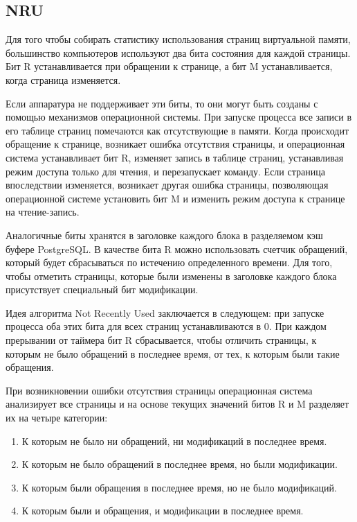 \subsection{NRU}

Для того чтобы собирать статистику использования страниц виртуальной памяти, большинство компьютеров используют два бита состояния для каждой страницы.
Бит R устанавливается при обращении к странице, а бит M устанавливается, когда страница изменяется.

Если аппаратура не поддерживает эти биты, то они могут быть созданы с помощью механизмов операционной системы.
При запуске процесса все записи в его таблице страниц помечаются как отсутствующие в памяти.
Когда происходит обращение к странице, возникает ошибка отсутствия страницы, и операционная система устанавливает бит R, изменяет запись в таблице страниц, устанавливая режим доступа только для чтения, и перезапускает команду.
Если страница впоследствии изменяется, возникает другая ошибка страницы, позволяющая операционной системе установить бит M и изменить режим доступа к странице на чтение-запись.

Аналогичные биты хранятся в заголовке каждого блока в разделяемом кэш буфере PostgreSQL.
В качестве бита R можно использовать счетчик обращений, который будет сбрасываться по истечению определенного времени.
Для того, чтобы отметить страницы, которые были изменены в заголовке каждого блока присутствует специальный бит модификации.

Идея алгоритма Not Recently Used заключается в следующем: при запуске процесса оба этих бита для всех страниц
устанавливаются в 0. 
При каждом прерывании от таймера бит R сбрасывается, чтобы отличить страницы, к которым не было обращений в последнее время, от тех, к которым были такие обращения.

При возникновении ошибки отсутствия страницы операционная система анализирует все страницы и на основе текущих значений битов R и M разделяет их на четыре категории:
\begin{enumerate}
	\item К которым не было ни обращений, ни модификаций в последнее время.
	\item К которым не было обращений в последнее время, но были модификации.
	\item К которым были обращения в последнее время, но не было модификаций.
	\item К которым были и обращения, и модификации в последнее время.
\end{enumerate}

